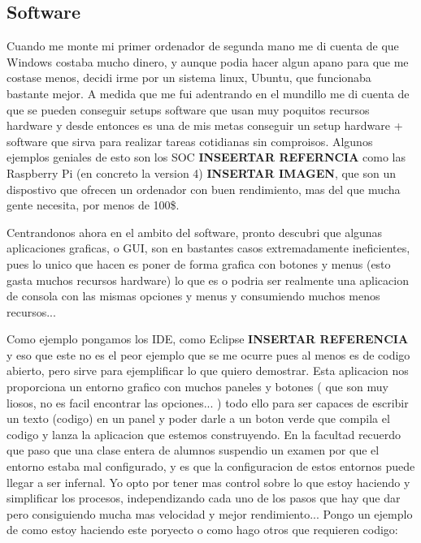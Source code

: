 \subsection{ Software }

Cuando me monte mi primer ordenador de segunda mano me di cuenta de que Windows costaba mucho dinero, y aunque podia hacer algun apano para que me costase menos, decidi irme por un sistema linux, Ubuntu, que funcionaba bastante mejor. A medida que me fui adentrando en el mundillo me di cuenta de que se pueden conseguir setups software que usan muy poquitos recursos hardware y desde entonces es una de mis metas conseguir un setup hardware + software que sirva para realizar tareas cotidianas sin comproisos. Algunos ejemplos geniales de esto son los SOC \textbf{INSEERTAR REFERNCIA} como las Raspberry Pi (en concreto la version 4) \textbf{INSERTAR IMAGEN}, que son un dispostivo que ofrecen un ordenador con buen rendimiento, mas del que mucha gente necesita, por menos de 100\$.

Centrandonos ahora en el ambito del software, pronto descubri que algunas aplicaciones graficas, o GUI, son en bastantes casos extremadamente ineficientes, pues lo unico que hacen es poner de forma grafica con botones y menus (esto gasta muchos recursos hardware) lo que es o podria ser realmente una aplicacion de consola con las mismas opciones y menus y consumiendo muchos menos recursos...

Como ejemplo pongamos los IDE, como Eclipse \textbf{INSERTAR REFERENCIA} y eso que este no es el peor ejemplo que se me ocurre pues al menos es de codigo abierto, pero sirve para ejemplificar lo que quiero demostrar. Esta aplicacion nos proporciona un entorno grafico con muchos paneles y botones ( que son muy liosos, no es facil encontrar las opciones... ) todo ello para ser capaces de escribir un texto (codigo) en un panel y poder darle a un boton verde que compila el codigo y lanza la aplicacion que estemos construyendo. En la facultad recuerdo que paso que una clase entera de alumnos suspendio un examen por que el entorno estaba mal configurado, y es que la configuracion de estos entornos puede llegar a ser infernal. Yo opto por tener mas control sobre lo que estoy haciendo y simplificar los procesos, independizando cada uno de los pasos que hay que dar pero consiguiendo mucha mas velocidad y mejor rendimiento... Pongo un ejemplo de como estoy haciendo este poryecto o como hago otros que requieren codigo:

